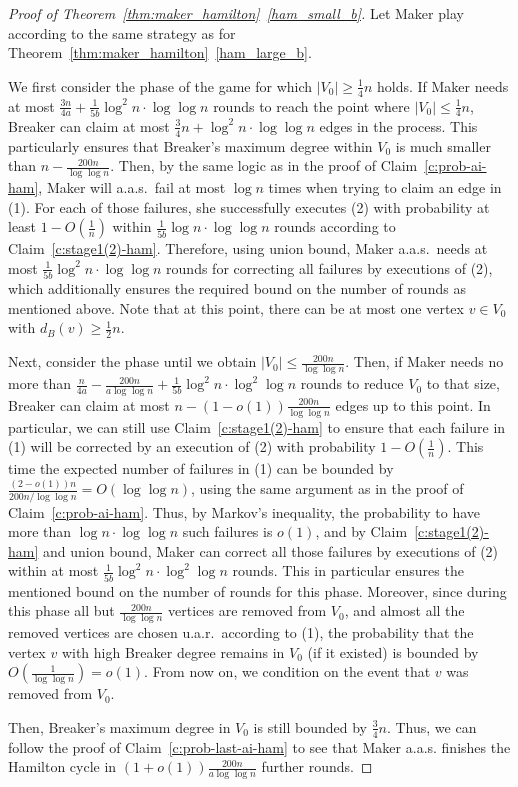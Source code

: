 \documentclass[11pt, a4paper]{article}
\numberwithin{equation}{section}
\numberwithin{figure}{section}
\begin{document}
\begin{proof}[Proof of Theorem~\ref{thm:maker_hamilton}~\ref{ham_small_b}]
Let Maker play according to the same strategy
as for Theorem~\ref{thm:maker_hamilton}~\ref{ham_large_b}.



We first consider the phase of the game for which 
$|V_0| \geq \frac14 n$ holds. If Maker needs at most $\frac{3n}{4a} + \frac{1}{5b}\log^2 n\cdot\log\log n$ rounds to reach the point where $|V_0| \leq \frac14 n$, Breaker can claim at most $\frac34 n + \log^2n \cdot \log\log n$ edges in the process. This particularly ensures that Breaker's maximum degree within $V_0$ is much smaller than
$n - \frac{200n}{\log\log n}$.
Then, by the same logic as in the proof of Claim~\ref{c:prob-ai-ham}, Maker will a.a.s.~fail at most $\log n$ times when trying to claim an edge in (1). For each of those failures, she successfully executes (2) with probability at least $1 - O(\frac{1}{n})$ within $\frac{1}{5b}\log n\cdot \log\log n$ rounds according to Claim~\ref{c:stage1(2)-ham}. Therefore, using union bound, Maker a.a.s.~needs at most $\frac{1}{5b}\log^2 n \cdot \log\log n$ rounds for correcting all failures by executions of (2), which additionally ensures the required bound on the number of rounds as mentioned above. Note that at this point, there can be at most one vertex $v \in V_0$ with $d_B(v) \geq \frac12 n$. 

Next, consider the phase until we obtain $|V_0| \leq \frac{200n}{\log\log n}$. Then, if Maker needs no more than $\frac{n}{4a} - \frac{200n}{a\log\log n} + \frac{1}{5b}\log^2 n \cdot \log^2\log n$ rounds to reduce $V_0$ to that size, Breaker can claim at most $n - (1 - o(1))\frac{200n}{\log\log n}$ edges up to this point. In particular, we can still use Claim~\ref{c:stage1(2)-ham} to ensure that each failure in (1) will be corrected by an execution of (2) with probability $1 - O(\frac{1}{n})$. This time the expected number of failures in (1) can be bounded by 
$\frac{(2 - o(1))n}{200n / \log\log n} = O(\log\log n)$, using the same argument as in the proof of Claim~\ref{c:prob-ai-ham}. Thus, by Markov's inequality, the probability to have more than $\log n\cdot \log\log n$ such failures is $o(1)$, and by Claim~\ref{c:stage1(2)-ham} and union bound, Maker can correct all those failures by executions of (2) within at most 
$\frac{1}{5b}\log^2 n \cdot \log^2\log n$ rounds. 
This in particular ensures the mentioned bound on the number of rounds for this phase.
Moreover, since during this phase all but 
$\frac{200n}{\log\log n}$ vertices are removed from $V_0$, 
and almost all the removed vertices
are chosen u.a.r.~according to (1),
the probability that the vertex $v$ with high Breaker degree remains in $V_0$ (if it existed) is bounded by $O(\frac{1}{\log\log n}) = o(1)$. From now on, we condition on the event that $v$ was removed from $V_0$. 

Then, Breaker's maximum degree in $V_0$ is still bounded by $\frac34 n$. Thus, we can follow the proof of Claim~\ref{c:prob-last-ai-ham} to see that Maker a.a.s. finishes the Hamilton cycle in $(1 + o(1))\frac{200n}{a\log\log n}$ further rounds.
\end{proof}
\end{document}
